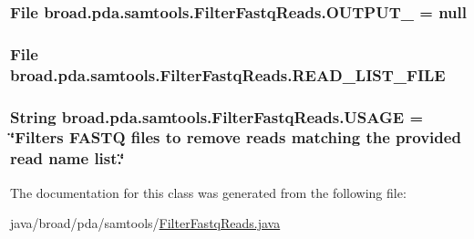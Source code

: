 \hypertarget{classbroad_1_1pda_1_1samtools_1_1_filter_fastq_reads_ab519c066d5791016b58d20274f97f50a}{
\subsubsection[{O\+U\+T\+P\+U\+T\+\_\+2}]{\setlength{\rightskip}{0pt plus 5cm}File broad.\+pda.\+samtools.\+Filter\+Fastq\+Reads.\+O\+U\+T\+P\+U\+T\+\_ = null}}\label{classbroad_1_1pda_1_1samtools_1_1_filter_fastq_reads_ab519c066d5791016b58d20274f97f50a}
\hypertarget{classbroad_1_1pda_1_1samtools_1_1_filter_fastq_reads_a5e87f72abd4a1ce14aec7d9056b837ed}{
\subsubsection[{R\+E\+A\+D\+\_\+\+L\+I\+S\+T\+\_\+\+F\+I\+L\+E}]{\setlength{\rightskip}{0pt plus 5cm}File broad.\+pda.\+samtools.\+Filter\+Fastq\+Reads.\+R\+E\+A\+D\+\_\+\+L\+I\+S\+T\+\_\+\+F\+I\+L\+E}}\label{classbroad_1_1pda_1_1samtools_1_1_filter_fastq_reads_a5e87f72abd4a1ce14aec7d9056b837ed}
\hypertarget{classbroad_1_1pda_1_1samtools_1_1_filter_fastq_reads_adbffc470b8dda8f1db3ff25fca7cebef}{
\subsubsection[{U\+S\+A\+G\+E}]{\setlength{\rightskip}{0pt plus 5cm}String broad.\+pda.\+samtools.\+Filter\+Fastq\+Reads.\+U\+S\+A\+G\+E = \char`\"{}Filters F\+A\+S\+T\+Q files to remove reads matching the provided read name list.\char`\"{}}}\label{classbroad_1_1pda_1_1samtools_1_1_filter_fastq_reads_adbffc470b8dda8f1db3ff25fca7cebef}


The documentation for this class was generated from the following file\+:\begin{DoxyCompactItemize}
\item 
java/broad/pda/samtools/\hyperlink{_filter_fastq_reads_8java}{Filter\+Fastq\+Reads.\+java}\end{DoxyCompactItemize}
